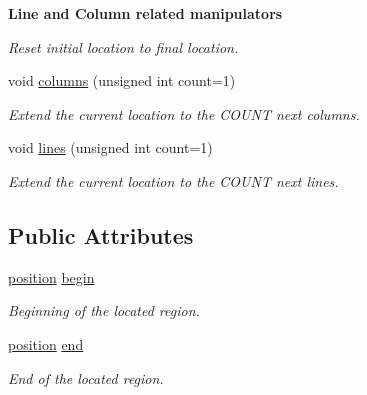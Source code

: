 \begin{Indent}{\bf Line and Column related manipulators}
\begin{DoxyCompactItemize}
\begin{DoxyCompactList}\small\item\em Reset initial location to final location. \end{DoxyCompactList}\item 
\hypertarget{classyy_1_1location_a044d2ef2831243279beb5e1b93ffca39}{void \hyperlink{classyy_1_1location_a044d2ef2831243279beb5e1b93ffca39}{columns} (unsigned int count=1)}\label{classyy_1_1location_a044d2ef2831243279beb5e1b93ffca39}

\begin{DoxyCompactList}\small\item\em Extend the current location to the C\-O\-U\-N\-T next columns. \end{DoxyCompactList}\item 
\hypertarget{classyy_1_1location_af05c5d78c5a53fb3aa4ef4e34c9eb723}{void \hyperlink{classyy_1_1location_af05c5d78c5a53fb3aa4ef4e34c9eb723}{lines} (unsigned int count=1)}\label{classyy_1_1location_af05c5d78c5a53fb3aa4ef4e34c9eb723}

\begin{DoxyCompactList}\small\item\em Extend the current location to the C\-O\-U\-N\-T next lines. \end{DoxyCompactList}\end{DoxyCompactItemize}
\end{Indent}
\subsection*{Public Attributes}
\begin{DoxyCompactItemize}
\item 
\hypertarget{classyy_1_1location_a70540e90479a85db4112b552d7e032cf}{\hyperlink{classyy_1_1position}{position} \hyperlink{classyy_1_1location_a70540e90479a85db4112b552d7e032cf}{begin}}\label{classyy_1_1location_a70540e90479a85db4112b552d7e032cf}

\begin{DoxyCompactList}\small\item\em Beginning of the located region. \end{DoxyCompactList}\item 
\hypertarget{classyy_1_1location_aa9be2a89fdb63da08167ebd4b819addd}{\hyperlink{classyy_1_1position}{position} \hyperlink{classyy_1_1location_aa9be2a89fdb63da08167ebd4b819addd}{end}}\label{classyy_1_1location_aa9be2a89fdb63da08167ebd4b819addd}

\begin{DoxyCompactList}\small\item\em End of the located region. \end{DoxyCompactList}\end{DoxyCompactItemize}



